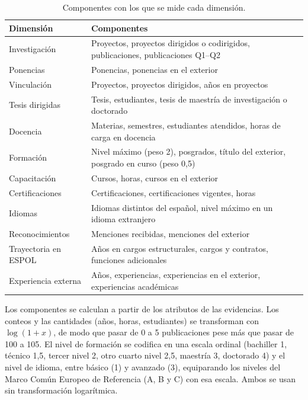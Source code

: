 \begin{table}[!htbp]
    \centering
    \caption{Componentes con los que se mide cada dimensión.}
    \label{tab:dimensiones}
    \footnotesize
    \begin{tabular}{>{\raggedright\arraybackslash}p{3.2cm} >{\raggedright\arraybackslash}p{11.2cm}}
        \toprule
        \textbf{Dimensión} & \textbf{Componentes} \\
        \midrule
        Investigación & Proyectos, proyectos dirigidos o codirigidos, publicaciones, publicaciones Q1--Q2 \\
        Ponencias & Ponencias, ponencias en el exterior \\
        Vinculación & Proyectos, proyectos dirigidos, años en proyectos \\
        Tesis dirigidas & Tesis, estudiantes, tesis de maestría de investigación o doctorado \\
        Docencia & Materias, semestres, estudiantes atendidos, horas de carga en docencia \\
        Formación & Nivel máximo (peso 2), posgrados, título del exterior, posgrado en curso (peso 0,5) \\
        Capacitación & Cursos, horas, cursos en el exterior \\
        Certificaciones & Certificaciones, certificaciones vigentes, horas \\
        Idiomas & Idiomas distintos del español, nivel máximo en un idioma extranjero \\
        Reconocimientos & Menciones recibidas, menciones del exterior \\
        Trayectoria en ESPOL & Años en cargos estructurales, cargos y contratos, funciones adicionales \\
        Experiencia externa & Años, experiencias, experiencias en el exterior, experiencias académicas \\
        \bottomrule
    \end{tabular}
\end{table}

Los componentes se calculan a partir de los atributos de las evidencias. Los conteos y las cantidades (años, horas, estudiantes) se transforman con $\log(1+x)$, de modo que pasar de 0 a 5 publicaciones pese más que pasar de 100 a 105. El nivel de formación se codifica en una escala ordinal (bachiller 1, técnico 1,5, tercer nivel 2, otro cuarto nivel 2,5, maestría 3, doctorado 4) y el nivel de idioma, entre básico (1) y avanzado (3), equiparando los niveles del Marco Común Europeo de Referencia (A, B y C) con esa escala. Ambos se usan sin transformación logarítmica.

